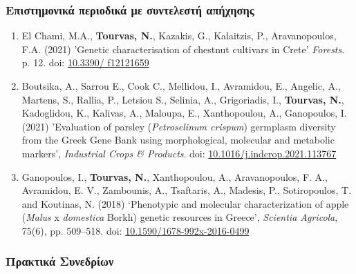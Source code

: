 \documentclass[12pt,]{scrartcl}
\begin{document}
\subsubsection{Επιστημονικά περιοδικά με συντελεστή απήχησης}\label{journals}
\vspace{-3mm}
\begin{enumerate}

\leftskip-0.07in

\item El Chami, M.A., \textbf{Tourvas, N.}, Kazakis, G., Kalaitzis, P., Aravanopoulos, F.A. (2021) 'Genetic characterisation of chestnut cultivars in Crete' \textit{Forests}. p. 12. doi: \href{https://doi.org/10.3390/f12121659}{10.3390/ 
f12121659}

\item Boutsika, A., Sarrou E., Cook C., Mellidou, I., Avramidou, E., Angelic, A., Martens, S., Rallia, P., Letsiou S., Selinia, A., Grigoriadis, I., \textbf{Tourvas, N.}, Kadoglidou, K., Kalivas, A., Maloupa, E., Xanthopoulou, A., Ganopoulos, I. (2021) 'Evaluation of parsley (\textit{Petroselinum crispum}) germplasm diversity from the Greek Gene Bank using morphological, molecular and metabolic markers', \textit{Industrial Crops \& Products}. doi: \href{https://doi.org/10.1016/j.indcrop.2021.113767}{10.1016/j.indcrop.2021.113767}

\item Ganopoulos, I., \textbf{Tourvas, N.}, Xanthopoulou, A., Aravanopoulos, F. A., Avramidou, E. V., Zambounis, A., Tsaftaris, A., Madesis, P., Sotiropoulos, T. and Koutinas, N. (2018) ‘Phenotypic and molecular characterization of apple (\textit{Malus} x \textit{domestica} Borkh) genetic resources in Greece’, \textit{Scientia Agricola}, 75(6), pp. 509–518. doi: \href{http://dx.doi.org/10.1590/1678-992x-2016-0499}{10.1590/1678-992x-2016-0499}

\end{enumerate}


\subsubsection{Πρακτικά Συνεδρίων}\label{conferences}
\end{document}
